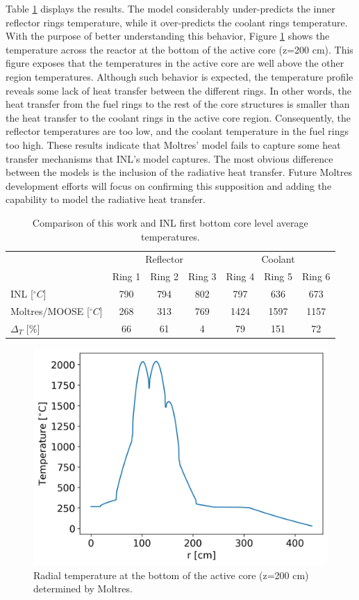 Table \ref{tab:th-ex2a-1st-results} displays the results.
The model considerably under-predicts the inner reflector rings temperature, while it over-predicts the coolant rings temperature.
With the purpose of better understanding this behavior, Figure \ref{fig:ex2a-1st-model-across} shows the temperature across the reactor at the bottom of the active core (z=200 cm).
This figure exposes that the temperatures in the active core are well above the other region temperatures.
Although such behavior is expected, the temperature profile reveals some lack of heat transfer between the different rings.
In other words, the heat transfer from the fuel rings to the rest of the core structures is smaller than the heat transfer to the coolant rings in the active core region.
Consequently, the reflector temperatures are too low, and the coolant temperature in the fuel rings too high.
These results indicate that Moltres' model fails to capture some heat transfer mechanisms that INL's model captures.
The most obvious difference between the models is the inclusion of the radiative heat transfer.
Future Moltres development efforts will focus on confirming this supposition and adding the capability to model the radiative heat transfer.

\begin{table}[htbp!]
\centering
      \caption{Comparison of this work and INL \cite{strydom_inl_2013} first bottom core level average temperatures.}
      \label{tab:th-ex2a-1st-results}
\begin{tabular}{lcccccc}
    \toprule
                & \multicolumn{3}{c}{Reflector} & \multicolumn{3}{c}{Coolant}   \\
                & Ring 1   & Ring 2   & Ring 3   & Ring 4   & Ring 5  & Ring 6  \\
    \midrule
INL [$^{\circ}C$]           & 790    & 794     & 802     & 797     & 636     & 673     \\
Moltres/MOOSE [$^{\circ}C$] & 268    & 313     & 769     & 1424    & 1597    & 1157    \\
$\Delta_T$ [\%]    & 66       & 61     & 4       & 79      & 151     & 72      \\
    \bottomrule
  \end{tabular}
\end{table}

\begin{figure}[htbp!]
  \centering
  \includegraphics[width=0.45\linewidth]{figures-thermal/ex2a-across}
  \hfill
  \caption{Radial temperature at the bottom of the active core (z=200 cm) determined by Moltres.}
  \label{fig:ex2a-1st-model-across}
\end{figure}


